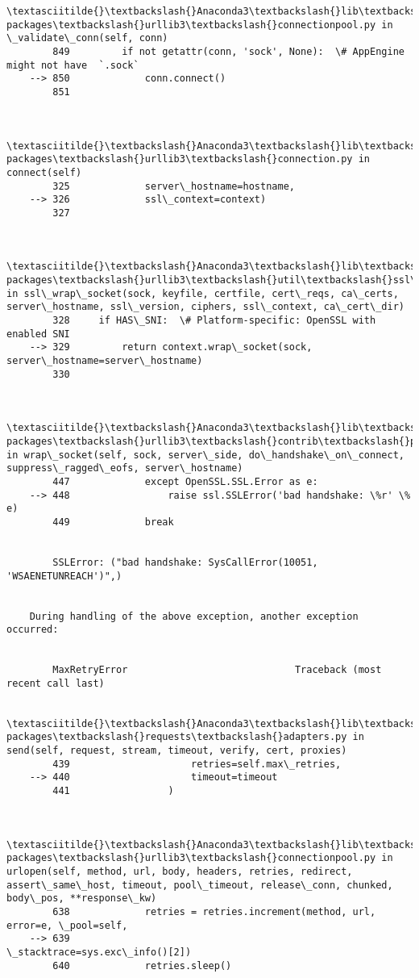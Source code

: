 \documentclass[11pt]{article}
\begin{document}
\begin{Verbatim}[commandchars=\\\{\}]
        \textasciitilde{}\textbackslash{}Anaconda3\textbackslash{}lib\textbackslash{}site-packages\textbackslash{}urllib3\textbackslash{}connectionpool.py in \_validate\_conn(self, conn)
        849         if not getattr(conn, 'sock', None):  \# AppEngine might not have  `.sock`
    --> 850             conn.connect()
        851 
    

        \textasciitilde{}\textbackslash{}Anaconda3\textbackslash{}lib\textbackslash{}site-packages\textbackslash{}urllib3\textbackslash{}connection.py in connect(self)
        325             server\_hostname=hostname,
    --> 326             ssl\_context=context)
        327 
    

        \textasciitilde{}\textbackslash{}Anaconda3\textbackslash{}lib\textbackslash{}site-packages\textbackslash{}urllib3\textbackslash{}util\textbackslash{}ssl\_.py in ssl\_wrap\_socket(sock, keyfile, certfile, cert\_reqs, ca\_certs, server\_hostname, ssl\_version, ciphers, ssl\_context, ca\_cert\_dir)
        328     if HAS\_SNI:  \# Platform-specific: OpenSSL with enabled SNI
    --> 329         return context.wrap\_socket(sock, server\_hostname=server\_hostname)
        330 
    

        \textasciitilde{}\textbackslash{}Anaconda3\textbackslash{}lib\textbackslash{}site-packages\textbackslash{}urllib3\textbackslash{}contrib\textbackslash{}pyopenssl.py in wrap\_socket(self, sock, server\_side, do\_handshake\_on\_connect, suppress\_ragged\_eofs, server\_hostname)
        447             except OpenSSL.SSL.Error as e:
    --> 448                 raise ssl.SSLError('bad handshake: \%r' \% e)
        449             break
    

        SSLError: ("bad handshake: SysCallError(10051, 'WSAENETUNREACH')",)

        
    During handling of the above exception, another exception occurred:
    

        MaxRetryError                             Traceback (most recent call last)

        \textasciitilde{}\textbackslash{}Anaconda3\textbackslash{}lib\textbackslash{}site-packages\textbackslash{}requests\textbackslash{}adapters.py in send(self, request, stream, timeout, verify, cert, proxies)
        439                     retries=self.max\_retries,
    --> 440                     timeout=timeout
        441                 )
    

        \textasciitilde{}\textbackslash{}Anaconda3\textbackslash{}lib\textbackslash{}site-packages\textbackslash{}urllib3\textbackslash{}connectionpool.py in urlopen(self, method, url, body, headers, retries, redirect, assert\_same\_host, timeout, pool\_timeout, release\_conn, chunked, body\_pos, **response\_kw)
        638             retries = retries.increment(method, url, error=e, \_pool=self,
    --> 639                                         \_stacktrace=sys.exc\_info()[2])
        640             retries.sleep()
    


\end{Verbatim}
\end{document}
